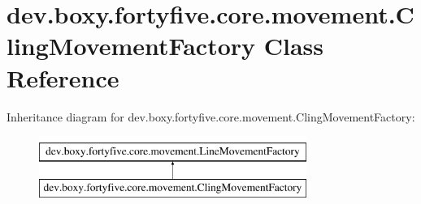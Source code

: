 \hypertarget{classdev_1_1boxy_1_1fortyfive_1_1core_1_1movement_1_1_cling_movement_factory}{
\section{dev.boxy.fortyfive.core.movement.ClingMovementFactory Class Reference}
\label{db/d15/classdev_1_1boxy_1_1fortyfive_1_1core_1_1movement_1_1_cling_movement_factory}
}
Inheritance diagram for dev.boxy.fortyfive.core.movement.ClingMovementFactory:\begin{figure}[H]
\begin{center}
\leavevmode
\includegraphics[height=2.000000cm]{db/d15/classdev_1_1boxy_1_1fortyfive_1_1core_1_1movement_1_1_cling_movement_factory}
\end{center}
\end{figure}
